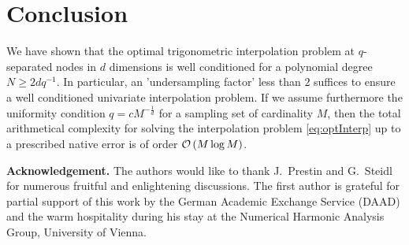 \documentclass[11pt,a4paper,bibtotoc]{scrartcl}
\numberwithin{equation}{section}
\numberwithin{table}{section}
\numberwithin{figure}{section}
\begin{document}
\section{Conclusion}
We have shown that the optimal trigonometric interpolation problem at
$q$-separated nodes in $d$ dimensions is well conditioned for a polynomial
degree $N \ge 2d q^{-1}$.
In particular, an 'undersampling factor' less than $2$ suffices to ensure a
well conditioned univariate interpolation problem.
If we assume furthermore the uniformity condition $q=c M^{-\frac{1}{d}}$ for a
sampling set of cardinality $M$, then the total arithmetical complexity for
solving the interpolation problem \eqref{eq:optInterp} up to a prescribed
native error is of order ${\cal O}\left(M \log M \right)$.

{\bf Acknowledgement.}
The authors would like to thank J.~Prestin and G.~Steidl for numerous
fruitful and enlightening discussions.
The first author is grateful for partial support of this work by the German
Academic Exchange Service (DAAD) and the warm hospitality during his stay at
the Numerical Harmonic Analysis Group, University of Vienna.


%

\end{document}
